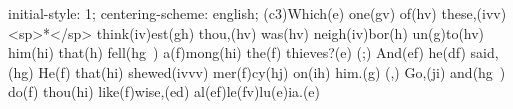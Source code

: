 initial-style: 1;
centering-scheme: english;
(c3)Which(e) one(gv) of(hv) these,(ivv) <sp>*</sp> think(iv)est(gh) thou,(hv) was(hv) neigh(iv)bor(h) un(g)to(hv) him(hi) that(h) fell(hg~) a(f)mong(hi) the(f) thieves?(e) (;) And(ef) he(df) said,(hg) He(f) that(hi) shewed(ivvv) mer(f)cy(hj) on(ih) him.(g) (,) Go,(ji) and(hg~) do(f) thou(hi) like(f)wise,(ed) al(ef)le(fv)lu(e)ia.(e)
